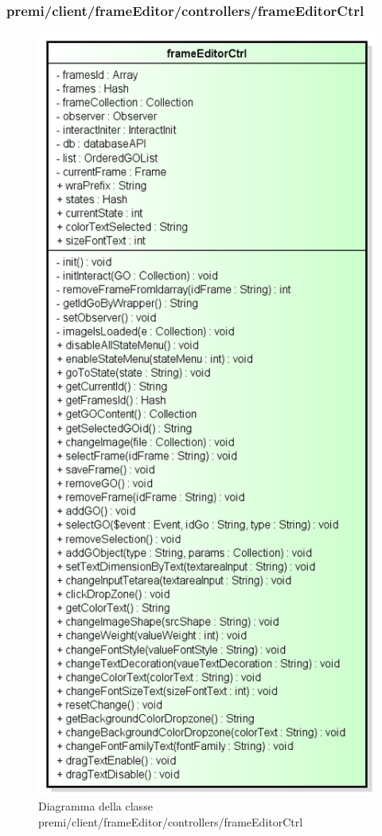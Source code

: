 \subsubsection{premi/client/frameEditor/controllers/frameEditorCtrl}
\begin{figure}[h]
\begin{center}
\includegraphics[scale=0.90]{img/diacla/frameEditorCtrl.png}
\caption{Diagramma della classe premi/client/frameEditor/controllers/frameEditorCtrl}
\end{center}
\end{figure}


